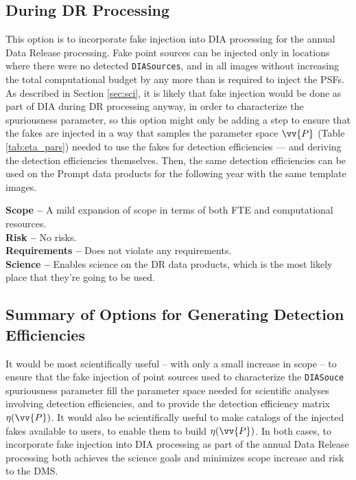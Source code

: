 \documentclass[DM,lsstdraft,toc]{lsstdoc}
\begin{document}
\subsection{During DR Processing}\label{sssec:DE_fakes_DR}

This option is to incorporate fake injection into DIA processing for the annual Data Release processing. Fake point sources can be injected only in locations where there were no detected {\tt DIASources}, and in all images without increasing the total computational budget by any more than is required to inject the PSFs. As described in Section \ref{sec:sci}, it is likely that fake injection would be done as part of DIA during DR processing anyway, in order to characterize the spuriousness parameter, so this option might only be adding a step to ensure that the fakes are injected in a way that samples the parameter space $\vv{P}$ (Table \ref{tab:eta_pars}) needed to use the fakes for detection efficiencies --- and deriving the detection efficiencies themselves. Then, the same detection efficiencies can be used on the Prompt data products for the following year with the same template images. 

{\bf Scope --} A mild expansion of scope in terms of both FTE and computational resources. \\
{\bf Risk --} No risks. \\
{\bf Requirements --} Does not violate any requirements. \\
{\bf Science --} Enables science on the DR data products, which is the most likely place that they're going to be used. 


\subsection{Summary of Options for Generating Detection Efficiencies}

It would be most scientifically useful -- with only a small increase in scope -- to ensure that the fake injection of point sources used to characterize the {\tt DIASouce} spuriousness parameter fill the parameter space needed for scientific analyses involving detection efficiencies, and to provide the detection efficiency matrix $\eta(\vv{P})$. It would also be scientifically useful to make catalogs of the injected fakes available to users, to enable them to build $\eta(\vv{P})$. In both cases, to incorporate fake injection into DIA processing as part of the annual Data Release processing both achieves the science goals and minimizes scope increase and risk to the DMS.
\end{document}
